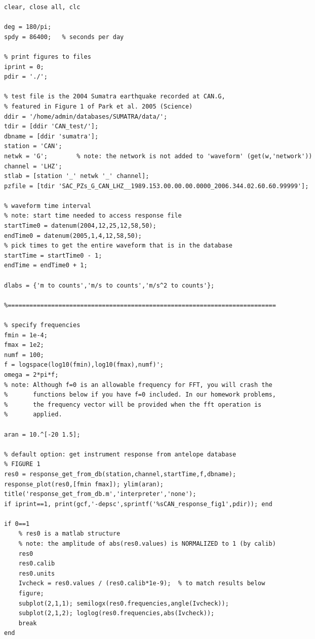 \documentclass[11pt,titlepage,fleqn]{article}
\begin{document}
\footnotesize
\begin{spacing}{1.0}
\begin{verbatim}
clear, close all, clc

deg = 180/pi;
spdy = 86400;   % seconds per day

% print figures to files
iprint = 0;
pdir = './';

% test file is the 2004 Sumatra earthquake recorded at CAN.G,
% featured in Figure 1 of Park et al. 2005 (Science)
ddir = '/home/admin/databases/SUMATRA/data/';
tdir = [ddir 'CAN_test/'];
dbname = [ddir 'sumatra'];
station = 'CAN';
netwk = 'G';        % note: the network is not added to 'waveform' (get(w,'network'))
channel = 'LHZ';
stlab = [station '_' netwk '_' channel];
pzfile = [tdir 'SAC_PZs_G_CAN_LHZ__1989.153.00.00.00.0000_2006.344.02.60.60.99999'];

% waveform time interval
% note: start time needed to access response file
startTime0 = datenum(2004,12,25,12,58,50);
endTime0 = datenum(2005,1,4,12,58,50);
% pick times to get the entire waveform that is in the database
startTime = startTime0 - 1;
endTime = endTime0 + 1;

dlabs = {'m to counts','m/s to counts','m/s^2 to counts'};

%==========================================================================

% specify frequencies
fmin = 1e-4;
fmax = 1e2;
numf = 100;
f = logspace(log10(fmin),log10(fmax),numf)';
omega = 2*pi*f;
% note: Although f=0 is an allowable frequency for FFT, you will crash the
%       functions below if you have f=0 included. In our homework problems,
%       the frequency vector will be provided when the fft operation is
%       applied.

aran = 10.^[-20 1.5];

% default option: get instrument response from antelope database
% FIGURE 1
res0 = response_get_from_db(station,channel,startTime,f,dbname);
response_plot(res0,[fmin fmax]); ylim(aran);
title('response_get_from_db.m','interpreter','none');
if iprint==1, print(gcf,'-depsc',sprintf('%sCAN_response_fig1',pdir)); end

if 0==1
    % res0 is a matlab structure
    % note: the amplitude of abs(res0.values) is NORMALIZED to 1 (by calib)
    res0
    res0.calib
    res0.units
    Ivcheck = res0.values / (res0.calib*1e-9);  % to match results below
    figure;
    subplot(2,1,1); semilogx(res0.frequencies,angle(Ivcheck));
    subplot(2,1,2); loglog(res0.frequencies,abs(Ivcheck));
    break
end


\end{verbatim}
\end{spacing}
\end{document}
